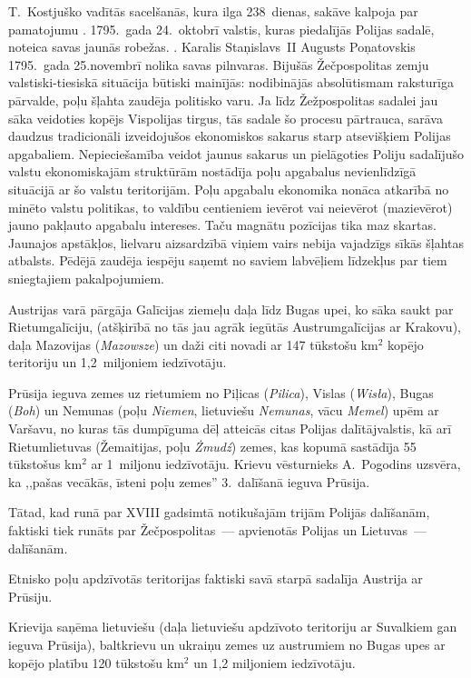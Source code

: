 \documentclass[twoside,a5paper,12pt,fleqn,openany]{extbook}
\newcommand{\pltxti}[1]{\textit{\textpolish{#1}}}
\newcommand{\detxti}[1]{\textit{\textgerman{#1}}}
\newcommand{\lttxti}[1]{\textit{\textlithuanian{#1}}}
\begin{document}
T.~Kostjuško vadītās sacelšanās, kura ilga 238~dienas, sakāve kalpoja par pamatojumu . 1795.~gada 24.~oktobrī valstis, kuras piedalījās Polijas sadalē, noteica savas jaunās robežas. . Karalis Staņislavs~II Augusts Poņatovskis 1795.~gada 25.novembrī nolika savas pilnvaras. Bijušās Žečpospolitas zemju valstiski-tiesiskā situācija būtiski mainījās: nodibinājās absolūtismam raksturīga pārvalde, poļu šļahta zaudēja politisko varu. Ja līdz Žežpospolitas sadalei jau sāka veidoties kopējs Vispolijas tirgus, tās sadale šo procesu pārtrauca, sarāva daudzus tradicionāli izveidojušos ekonomiskos sakarus starp atsevišķiem Polijas apgabaliem. Nepieciešamība veidot jaunus sakarus un pielāgoties Poliju sadalījušo valstu ekonomiskajām struktūrām nostādīja poļu apgabalus nevienlīdzīgā situācijā ar šo valstu teritorijām. Poļu apgabalu ekonomika nonāca atkarībā no minēto valstu politikas, to valdību centieniem ievērot vai neievērot (mazievērot) jauno pakļauto apgabalu intereses. Taču magnātu pozīcijas tika maz skartas. Jaunajos apstākļos, lielvaru aizsardzībā viņiem vairs nebija vajadzīgs sīkās šļahtas atbalsts. Pēdējā zaudēja iespēju saņemt no saviem labvēļiem līdzekļus par tiem sniegtajiem pakalpojumiem.

Austrijas varā pārgāja Galīcijas ziemeļu daļa līdz Bugas upei, ko sāka saukt par Rietumgalīciju, (atšķirībā no tās jau agrāk iegūtās Austrumgalīcijas ar Krakovu), daļa Mazovijas (\pltxti{Mazowsze}) un daži citi novadi ar 147 tūkstošu km$^{2}$ kopējo teritoriju un 1,2~miljoniem iedzīvotāju.

Prūsija ieguva zemes uz rietumiem no Piļicas (\pltxti{Pilica}), Vislas (\pltxti{Wisła}), Bugas (\pltxti{Boh}) un Nemunas (poļu \pltxti{Niemen}, lietuviešu \lttxti{Nemunas}, vācu \detxti{Memel}) upēm ar Varšavu, no kuras tās dumpīguma dēļ atteicās citas Polijas dalītājvalstis, kā arī Rietumlietuvas (Žemaitijas, poļu \pltxti{Żmudź}) zemes, kas kopumā sastādīja 55 tūkstošus km$^{2}$ ar 1~miljonu iedzīvotāju. Krievu vēsturnieks A.~Pogodins uzsvēra, ka ,,pašas vecākās, īsteni poļu zemes'' 3.~dalīšanā ieguva Prūsija.

Tātad, kad runā par XVIII gadsimtā notikušajām trijām Polijās dalīšanām, faktiski tiek runāts par Žečpospolitas~--- apvienotās Polijas un Lietuvas~--- dalīšanām.

Etnisko poļu apdzīvotās teritorijas faktiski savā starpā sadalīja Austrija ar Prūsiju.

Krievija saņēma lietuviešu (daļa lietuviešu apdzīvoto teritoriju ar Suvalkiem gan ieguva Prūsija), baltkrievu un ukraiņu zemes uz austrumiem no Bugas upes ar kopējo platību 120 tūkstošu km$^{2}$ un 1,2 miljoniem iedzīvotāju.
\end{document}
